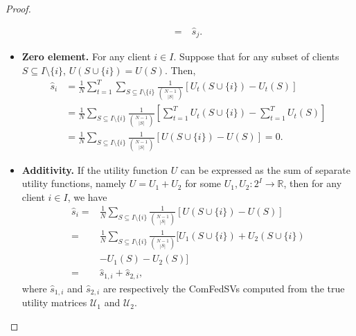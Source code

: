 \begin{proof}
\begin{itemize}
\begin{align*}
        = &~\hat s_j.
    \end{align*}
    \item \textbf{Zero element.} For any client $i \in I$. Suppose that for any subset of clients $S \subseteq I \setminus \{i\}$, $U(S \cup \{i\}) = U(S)$. Then, 
    \begin{align*}
        \hat s_i &= \frac{1}{N} \sum_{t=1}^T\sum\limits_{S \subseteq I \setminus\{i\}} \frac{1}{\binom{N-1}{|S|}} \left[ U_t(S \cup\{i\}) - U_t(S)\right] \\
        &= \frac{1}{N}\sum\limits_{S \subseteq I \setminus\{i\}} \frac{1}{\binom{N-1}{|S|}} \left[\sum_{t=1}^T U_t(S \cup\{i\}) - \sum_{t=1}^T U_t(S)\right]\\
        &= \frac{1}{N}\sum\limits_{S \subseteq I \setminus\{i\}} \frac{1}{\binom{N-1}{|S|}} \left[ U(S \cup\{i\}) - U(S)\right] = 0.
    \end{align*}
    \item \textbf{Additivity.} If the utility function $U$ can be expressed as the sum of separate utility functions, namely $U = U_1 + U_2$ for some $U_1, U_2 : 2^I \to \mathbb{R}$, then for any client $i \in I$, we have
    \begin{align*}
        \hat s_i 
        = & \frac{1}{N}\sum\limits_{S \subseteq I \setminus\{i\}} \frac{1}{\binom{N-1}{|S|}} \left[ U(S \cup\{i\}) - U(S)\right] 
        \\= &\frac{1}{N}\sum\limits_{S \subseteq I \setminus\{i\}} \frac{1}{\binom{N-1}{|S|}} \bigg[ U_1(S \cup\{i\}) + U_2(S \cup\{i\}) 
        \\&- U_1(S) - U_2(S)\bigg] 
        \\=& \hat s_{1,i} + \hat s_{2, i},
    \end{align*}
    where $\hat s_{1,i}$ and $\hat s_{2, i}$ are respectively the ComFedSVs computed from the true utility matrices $\mathcal{U}_1$ and $\mathcal{U}_2$.  
\end{itemize}


\end{proof}
